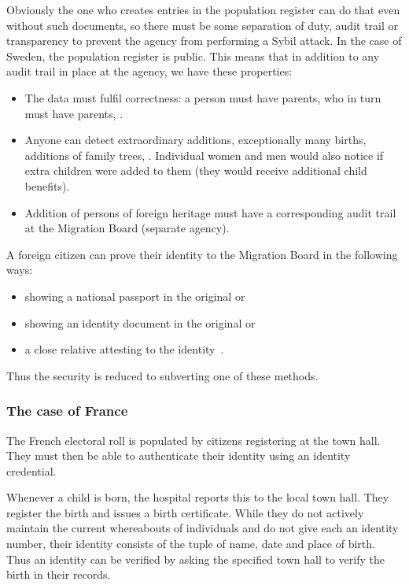 Obviously the one who creates entries in the population register can do that 
even without such documents, so there must be some separation of duty, audit 
trail or transparency to prevent the agency from performing a Sybil attack.
In the case of Sweden, the population register is public.
This means that in addition to any audit trail in place at the agency, we have 
these properties:
\begin{itemize}
  \item The data must fulfil correctness: a person must have parents, who in 
    turn must have parents, \etc.
  \item Anyone can detect extraordinary additions, \eg exceptionally many 
    births, additions of family trees, \etc.
    Individual women and men would also notice if extra children were added to 
    them (they would receive additional child benefits).
  \item Addition of persons of foreign heritage must have a corresponding audit 
    trail at the Migration Board (separate agency).
\end{itemize}
A foreign citizen can prove their identity to the Migration Board in the 
following ways:
\begin{itemize}
  \item showing a national passport in the original or
  \item showing an identity document in the original or
  \item a close relative attesting to the 
    identity~\cite{Migrationsverket-ProvenIdentity}.
\end{itemize}
Thus the security is reduced to subverting one of these methods.

\subsubsection{The case of France}

The French electoral roll is populated by citizens registering at the town 
hall.
They must then be able to authenticate their identity using an identity 
credential.

Whenever a child is born, the hospital reports this to the local town hall.
They register the birth and issues a birth certificate.
While they do not actively maintain the current whereabouts of individuals and 
do not give each an identity number, their identity consists of the tuple of 
name, date and place of birth.
Thus an identity can be verified by asking the specified town hall to verify 
the birth in their records.

